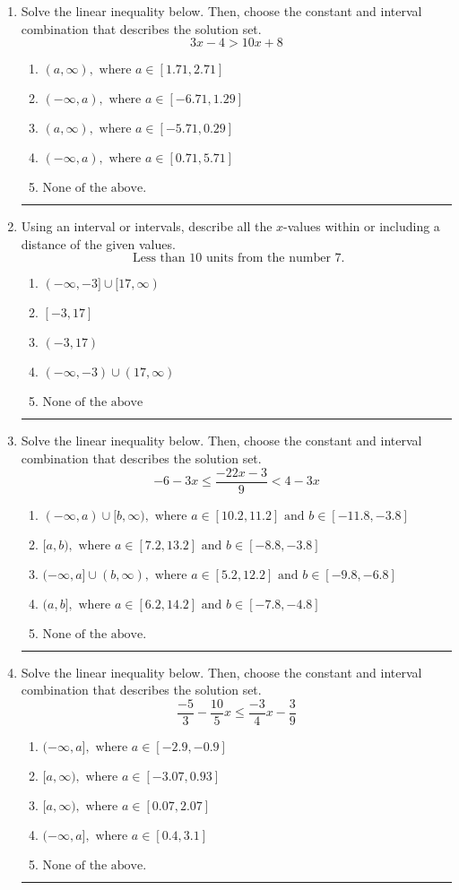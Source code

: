 \documentclass[14pt]{extbook}
\newcommand{\litem}[1]{\item#1\hspace*{-1cm}\rule{\textwidth}{0.4pt}}
\begin{document}
\begin{enumerate}
\litem{
Solve the linear inequality below. Then, choose the constant and interval combination that describes the solution set.\[ 3x -4 > 10x + 8 \]\begin{enumerate}[label=\Alph*.]
\item \( (a, \infty), \text{ where } a \in [1.71, 2.71] \)
\item \( (-\infty, a), \text{ where } a \in [-6.71, 1.29] \)
\item \( (a, \infty), \text{ where } a \in [-5.71, 0.29] \)
\item \( (-\infty, a), \text{ where } a \in [0.71, 5.71] \)
\item \( \text{None of the above}. \)

\end{enumerate} }
\litem{
Using an interval or intervals, describe all the $x$-values within or including a distance of the given values.\[ \text{ Less than } 10 \text{ units from the number } 7. \]\begin{enumerate}[label=\Alph*.]
\item \( (-\infty, -3] \cup [17, \infty) \)
\item \( [-3, 17] \)
\item \( (-3, 17) \)
\item \( (-\infty, -3) \cup (17, \infty) \)
\item \( \text{None of the above} \)

\end{enumerate} }
\litem{
Solve the linear inequality below. Then, choose the constant and interval combination that describes the solution set.\[ -6 - 3 x \leq \frac{-22 x - 3}{9} < 4 - 3 x \]\begin{enumerate}[label=\Alph*.]
\item \( (-\infty, a) \cup [b, \infty), \text{ where } a \in [10.2, 11.2] \text{ and } b \in [-11.8, -3.8] \)
\item \( [a, b), \text{ where } a \in [7.2, 13.2] \text{ and } b \in [-8.8, -3.8] \)
\item \( (-\infty, a] \cup (b, \infty), \text{ where } a \in [5.2, 12.2] \text{ and } b \in [-9.8, -6.8] \)
\item \( (a, b], \text{ where } a \in [6.2, 14.2] \text{ and } b \in [-7.8, -4.8] \)
\item \( \text{None of the above.} \)

\end{enumerate} }
\litem{
Solve the linear inequality below. Then, choose the constant and interval combination that describes the solution set.\[ \frac{-5}{3} - \frac{10}{5} x \leq \frac{-3}{4} x - \frac{3}{9} \]\begin{enumerate}[label=\Alph*.]
\item \( (-\infty, a], \text{ where } a \in [-2.9, -0.9] \)
\item \( [a, \infty), \text{ where } a \in [-3.07, 0.93] \)
\item \( [a, \infty), \text{ where } a \in [0.07, 2.07] \)
\item \( (-\infty, a], \text{ where } a \in [0.4, 3.1] \)
\item \( \text{None of the above}. \)


\end{enumerate}}
\end{enumerate}
\end{document}

